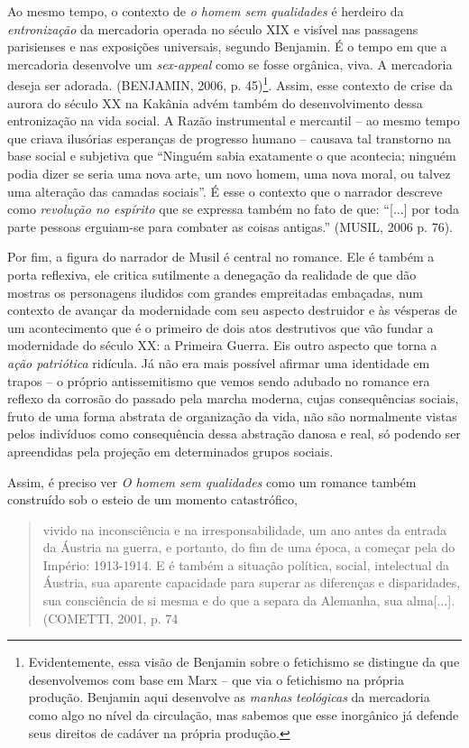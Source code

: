 Ao mesmo tempo, o contexto de \emph{o homem sem qualidades} é herdeiro
da \emph{entronização} da mercadoria operada no século XIX e visível nas
passagens parisienses e nas exposições universais, segundo Benjamin. É o
tempo em que a mercadoria desenvolve um \emph{sex-appeal} como se fosse
orgânica, viva. A mercadoria deseja ser adorada. (BENJAMIN, 2006, p.
45)\footnote{Evidentemente, essa visão de Benjamin sobre o fetichismo se
  distingue da que desenvolvemos com base em Marx -- que via o
  fetichismo na própria produção. Benjamin aqui desenvolve as
  \emph{manhas} \emph{teológicas} da mercadoria como algo no nível da
  circulação, mas sabemos que esse inorgânico já defende seus direitos
  de cadáver na própria produção.}. Assim, esse contexto de crise da
aurora do século XX na Kakânia advém também do desenvolvimento dessa
entronização na vida social. A Razão instrumental e mercantil -- ao
mesmo tempo que criava ilusórias esperanças de progresso humano --
causava tal transtorno na base social e subjetiva que ``Ninguém sabia
exatamente o que acontecia; ninguém podia dizer se seria uma nova arte,
um novo homem, uma nova moral, ou talvez uma alteração das camadas
sociais''. É esse o contexto que o narrador descreve como
\emph{revolução no espírito} que se expressa também no fato de que:
``{[}...{]} por toda parte pessoas erguiam-se para combater as coisas
antigas.'' (MUSIL, 2006 p. 76).

Por fim, a figura do narrador de Musil é central no romance. Ele é
também a porta reflexiva, ele critica sutilmente a denegação da
realidade de que dão mostras os personagens iludidos com grandes
empreitadas embaçadas, num contexto de avançar da modernidade com seu
aspecto destruidor e às vésperas de um acontecimento que é o primeiro de
dois atos destrutivos que vão fundar a modernidade do século XX: a
Primeira Guerra. Eis outro aspecto que torna a \emph{ação patriótica}
ridícula. Já não era mais possível afirmar uma identidade em trapos -- o
próprio antissemitismo que vemos sendo adubado no romance era reflexo da
corrosão do passado pela marcha moderna, cujas consequências sociais,
fruto de uma forma abstrata de organização da vida, não são normalmente
vistas pelos indivíduos como consequência dessa abstração danosa e real,
só podendo ser apreendidas pela projeção em determinados grupos sociais.

Assim, é preciso ver \emph{O homem sem qualidades} como um romance
também construído sob o esteio de um momento catastrófico,

\begin{quote}
vivido na inconsciência e na irresponsabilidade, um ano antes da entrada
da Áustria na guerra, e portanto, do fim de uma época, a começar pela do
Império: 1913-1914. E é também a situação política, social, intelectual
da Áustria, sua aparente capacidade para superar as diferenças e
disparidades, sua consciência de si mesma e do que a separa da Alemanha,
sua alma{[}...{]}.(COMETTI, 2001, p. 74
\end{quote}

